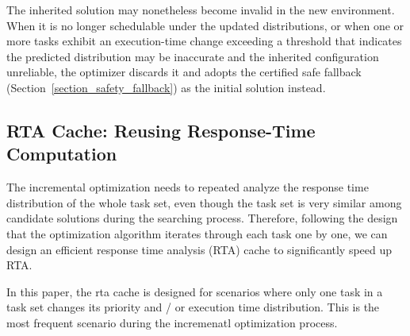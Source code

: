     The inherited solution may nonetheless become invalid in the new environment.
    When it is no longer schedulable under the updated distributions, or when one or more tasks exhibit an execution-time change exceeding a threshold that indicates the predicted distribution may be inaccurate and the inherited configuration unreliable, the optimizer discards it and adopts the certified safe fallback (Section~\ref{section_safety_fallback}) as the initial solution instead.
    

	\subsection{RTA Cache: Reusing Response-Time Computation}
	\label{section_rta_cache}

    The incremental optimization needs to repeated analyze the response time distribution of the whole task set, even though the task set is very similar among candidate solutions during the searching process.
    Therefore, following the design that the optimization algorithm iterates through each task one by one, we can design an efficient response time analysis (RTA) cache to significantly speed up RTA.

    In this paper, the rta cache is designed for scenarios where only one task in a task set changes its priority and / or execution time distribution. 
    This is the most frequent scenario during the incremenatl optimization process.
  
